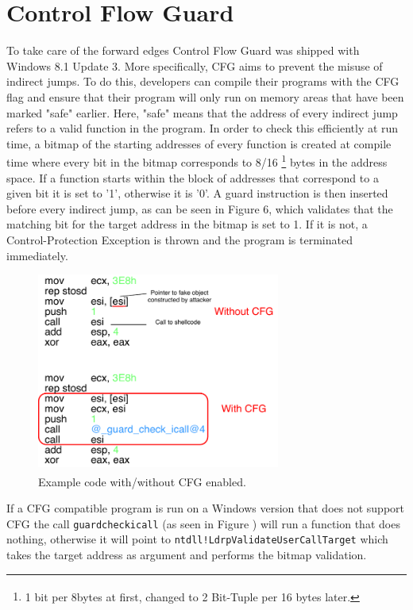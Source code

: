 \documentclass[10pt,twocolumn,a4paper]{article}
\begin{document}
\section{Control Flow Guard}\label{CFG}
To take care of the forward edges Control Flow Guard was shipped with Windows 8.1 Update 3\cite{cfgexplore}.
More specifically, CFG aims to prevent the misuse of indirect jumps.
To do this, developers can compile their programs with the CFG flag and ensure that their program will only run on memory areas that have been marked "safe" earlier\cite{CFG2}.
Here, "safe" means that the address of every indirect jump refers to a valid function in the program.
In order to check this efficiently at run time, a bitmap of the starting addresses of every function is created at compile time where every bit in the bitmap corresponds to 8/16 \footnote{1 bit per 8bytes at first, changed to 2 Bit-Tuple per 16 bytes later\textsuperscript{\cite{tuple}}.} bytes in the address space\cite{cfgexplore}.
If a function starts within the block of addresses that correspond to a given bit it is set to '1', otherwise it is '0'.
A guard instruction is then inserted before every indirect jump, as can be seen in Figure 6, which validates that the matching bit for the target address in the bitmap is set to 1\cite{cfgexplore}. If it is not, a Control-Protection Exception is thrown and the program is terminated immediately\cite{SS}.
\begin{figure}[htbp]
	\includegraphics[keepaspectratio,width=8cm]{fig/cfg}
	\caption{Example code with/without CFG enabled\textsuperscript{\cite{cfgexplore}}.}
\end{figure}
\newline If a CFG compatible program is run on a Windows version that does not support CFG the call \texttt{\textunderscore guard\textunderscore check\textunderscore icall} (as seen in Figure ) will run a function that does nothing, otherwise it will point to \texttt{ntdll!LdrpValidateUserCallTarget} which takes the target address as argument and performs the bitmap validation\cite{cfgexplore}.
\end{document}
